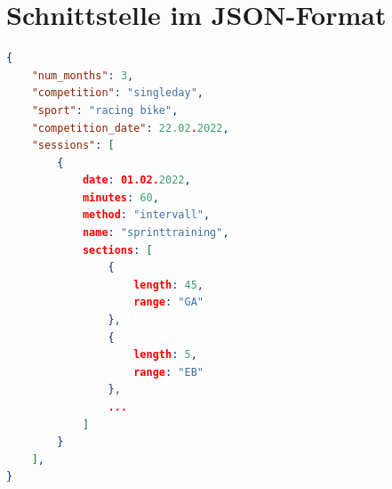 \newpage

\label{anhang:beispielplan}


\newpage

\section{Schnittstelle im JSON-Format}
\label{anhang:json}
\begin{lstlisting}[language=json,firstnumber=1]
{ 
    "num_months": 3,
    "competition": "singleday",
    "sport": "racing bike",
    "competition_date": 22.02.2022,
    "sessions": [
        {
            date: 01.02.2022,
            minutes: 60,
            method: "intervall",
            name: "sprinttraining", 
            sections: [
                {
                    length: 45,
                    range: "GA"
                },
                {
                    length: 5,
                    range: "EB"
                },
                ...
            ]
        }
    ], 
}
\end{lstlisting}
